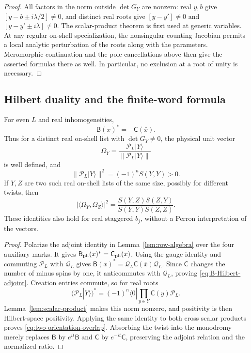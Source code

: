 \begin{proof}
All factors in the norm outside $\det G_Y$ are nonzero: real $y,b$
give $[y-b\pm i\lambda/2]\ne0$, and distinct real roots give
$[y-y']\ne0$ and $[y-y'\pm i\lambda]\ne0$.
The scalar-product theorem is first used at generic variables.
At any regular on-shell specialization, the nonsingular counting
Jacobian permits a local analytic perturbation of the roots along
with the parameters.  Meromorphic continuation and the pole
cancellations above then give the asserted formulas there as well.
In particular, no exclusion at a root of unity is necessary.
\end{proof}

\subsection{Hilbert duality and the finite-word formula}

\begin{lemma}\label{lem:hilbert-dual}
For even $L$ and real inhomogeneities,
\begin{equation}\label{eq:B-Hilbert-adjoint}
 \mathsf B(x)^*=-\mathsf C(\bar x).
\end{equation}
Thus for a distinct real on-shell list with $\det G_Y\ne0$, the
physical unit vector
\begin{equation}\label{eq:physical-Bethe-vector}
 \Omega_Y=\frac{\mathcal P_L|Y\rangle}{\|\mathcal P_L|Y\rangle\|}
\end{equation}
is well defined, and
\[
 \|\mathcal P_L|Y\rangle\|^2=(-1)^nS(Y,Y)>0.
\]
If $Y,Z$ are two such real on-shell lists of the same size, possibly
for different twists, then
\begin{equation}\label{eq:two-orientation-overlap}
 |\langle\Omega_Y,\Omega_Z\rangle|^2
       =\frac{S(Y,Z)S(Z,Y)}{S(Y,Y)S(Z,Z)}.
\end{equation}
These identities also hold for real staggered $b_j$, without a Perron
interpretation of the vectors.
\end{lemma}

\begin{proof}
Polarize the adjoint identity in Lemma~\ref{lem:row-algebra} over the
four auxiliary marks.  It gives
$\mathsf B_{\rm ph}(x)^*=\mathsf C_{\rm ph}(\bar x)$.
Using the gauge identity and commuting $\mathcal P_L$ with
$\mathcal Q_L$ gives
$\mathsf B(x)^*=\mathcal Q_L\mathsf C(\bar x)\mathcal Q_L$.
Since $\mathsf C$ changes the number of minus spins by one, it
anticommutes with $\mathcal Q_L$, proving
\eqref{eq:B-Hilbert-adjoint}.  Creation entries commute, so for real
roots
\[
 (\mathcal P_L|Y\rangle)^*
       =(-1)^n\langle0|\prod_{y\in Y}\mathsf C(y)\mathcal P_L.
\]
Lemma~\ref{lem:scalar-product} makes this norm nonzero, and positivity
is then Hilbert-space positivity.  Applying the same identity to both
cross scalar products proves \eqref{eq:two-orientation-overlap}.
Absorbing the twist into the monodromy merely replaces
$\mathsf B$ by $e^{it}\mathsf B$ and $\mathsf C$ by
$e^{-it}\mathsf C$, preserving the adjoint relation and the normalized
ratio.
\end{proof}

